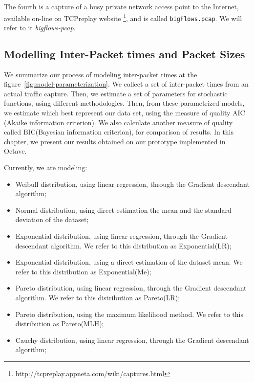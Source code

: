 The fourth is a capture of a busy private network access point to the Internet, available on-line on TCPreplay\cite{web-tcpreplay} website \footnote{ http://tcpreplay.appneta.com/wiki/captures.html}, and is called \texttt{bigFlows.pcap}. We will refer to it \textit{bigflows-pcap}.



\subsection{Modelling Inter-Packet times and Packet Sizes}

We summarize our process of modeling inter-packet times at the figure~\ref{fig:model-parameterization}. We collect a set of inter-packet times from an actual traffic capture. Then, we estimate a set of parameters for stochastic functions, using different methodologies. Then, from these parametrized models, we estimate which best represent our data set, using the measure of quality AIC (Akaike information criterion). We also calculate another measure of quality called BIC(Bayesian information criterion), for comparison of results. In this chapter, we present our results obtained on our prototype implemented in Octave.

Currently, we are modeling:

\begin{itemize}
	\item Weibull distribution, using linear regression, through the Gradient descendant algorithm;
	\item Normal distribution, using direct estimation the mean and the standard deviation of the dataset;
	\item Exponential distribution, using linear regression, through the Gradient descendant algorithm. We refer to this distribution as Exponential(LR);
	\item Exponential distribution, using a direct estimation of the dataset mean. We refer to this distribution as Exponential(Me);
	\item Pareto distribution, using linear regression, through the Gradient descendant algorithm. We refer to this distribution as Pareto(LR);
	\item Pareto distribution, using the maximum likelihood method. We refer to this distribution as Pareto(MLH);
	\item Cauchy distribution, using linear regression, through the Gradient descendant algorithm;
\end{itemize}



